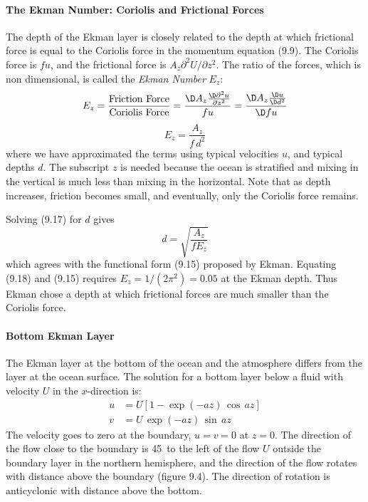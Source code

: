 \paragraph{The Ekman Number: Coriolis and Frictional Forces}
The depth of the Ekman layer is closely related to the depth at which
frictional force is equal to the Coriolis force
in the momentum equation (9.9). The Coriolis force is $f u$, and the
frictional force is $A_z \partial^2 U/\partial z^2$. The ratio of the
forces, which is non dimensional, is called the \textit{Ekman
  Number} $E_z$:
\begin{displaymath}
E_z=\frac{\text{Friction Force}}{\text{Coriolis Force}} = \frac{\D A_z\frac{\D\partial^2u}{\partial{z^2}}}{fu} = \frac{\D A_z\frac{\D
u}{\D d^2}}{\D fu}
\end{displaymath}
\begin{equation}
\boxed{E_z = \frac{A_z}{f\,d^2}}
\end{equation}
where we have approximated the terms using typical velocities $u$, and
typical depths $d$. The subscript $z$ is needed because the ocean is
stratified and mixing in the vertical is much less than mixing in the
horizontal. Note that as depth increases, friction becomes small, and
eventually, only the Coriolis force remains.

Solving (9.17) for $d$ gives
\begin{equation}
d = \sqrt{\frac{A_z}{fE_z}}
\end{equation}
which agrees with the functional form (9.15) proposed by
Ekman. Equating (9.18) and (9.15) requires $E_z = 1/(2\pi^2) = 0.05$
at the Ekman depth. Thus Ekman chose a depth at which frictional
forces are much smaller than the Coriolis force.

\paragraph{Bottom Ekman Layer}
The Ekman layer at the bottom of the ocean
and the atmosphere differs from the layer at the ocean surface. The
solution for a bottom layer below a fluid with velocity $U$ in the
$x$-direction is:
\begin{subequations}
\begin{align}
u&=U[1 - \exp(-az)\,\cos\,az]  \\
v&=U\,\exp(-az)\,\sin\,az
\end{align}
\end{subequations}
The velocity goes to zero at the boundary, $u = v = 0$ at $z = 0$. The
direction of the flow close to the boundary is 45\degrees\ to the left
of the flow $U$ outside the boundary layer in the northern hemisphere,
and the direction of the flow rotates with distance above the boundary
(figure 9.4). The direction of rotation is anti\-cyclonic with
distance above the bottom.

